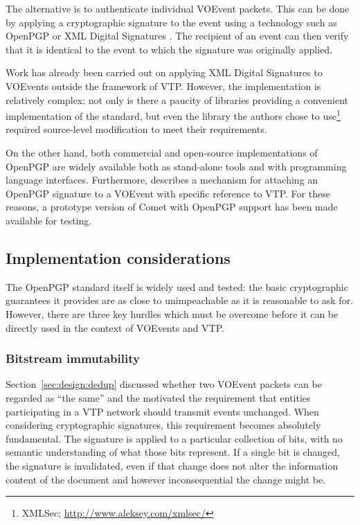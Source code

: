 \documentclass[5p,authoryear]{elsarticle}
\begin{document}
The alternative is to authenticate individual VOEvent packets. This can be
done by applying a cryptographic signature to the event using a technology
such as OpenPGP \citep{Callas:2007} or XML Digital Signatures
\citep{Bartel:2008}. The recipient of an event can then verify that it is
identical to the event to which the signature was originally applied.

Work has already been carried out on applying XML Digital Signatures to
VOEvents \citep{Allen:2008} outside the framework of VTP\@. However, the
implementation is relatively complex: not only is there a paucity of libraries
providing a convenient implementation of the standard, but even the library
the authors chose to use\footnote{XMLSec;
\url{http://www.aleksey.com/xmlsec/}} required source-level modification to
meet their requirements.

On the other hand, both commercial and open-source implementations of OpenPGP
are widely available both as stand-alone tools and with programming language
interfaces. Furthermore, \citet{Denny:2008} describes a mechanism for
attaching an OpenPGP signature to a VOEvent with specific reference to VTP\@.
For these reasons, a prototype version of Comet with OpenPGP support has been
made available for testing.

\subsection{Implementation considerations}

The OpenPGP standard itself is widely used and tested: the basic cryptographic
guarantees it provides are as close to unimpeachable as it is reasonable to
ask for. However, there are three key hurdles which must be overcome before it
can be directly used in the context of VOEvents and VTP.

\subsubsection{Bitstream immutability}

Section~\ref{sec:design:dedup} discussed whether two VOEvent packets can be
regarded as ``the same'' and the motivated the requirement that entities
participating in a VTP network should transmit events unchanged. When
considering cryptographic signatures, this requirement becomes absolutely
fundamental. The signature is applied to a particular collection of bits, with
no semantic understanding of what those bits represent. If a single bit is
changed, the signature is invalidated, even if that change does not alter the
information content of the document and however inconsequential the change
might be.
\end{document}
